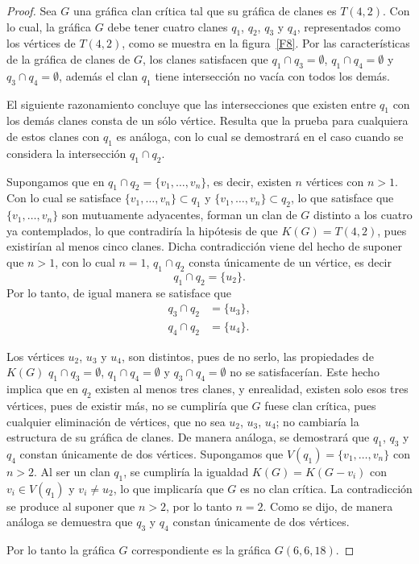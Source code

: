 \documentclass[12pt]{book}
\theoremstyle{definition}
\begin{document}
\begin{proof}
Sea $G$ una gráfica clan crítica tal que su gráfica de clanes es $T(4,2)$. Con lo cual, la gráfica $G$ debe tener cuatro clanes $q_1$, $q_2$, $q_3$ y $q_4$, representados como los vértices de $T(4,2)$, como se muestra en la figura~\ref{F8}. Por las características de la gráfica de clanes de $G$, los clanes satisfacen que $q_1\cap q_3=\emptyset$, $q_1\cap q_4=\emptyset$ y $q_3\cap q_4=\emptyset$, además el clan $q_1$ tiene intersección no vacía con todos los demás.

El siguiente razonamiento concluye que las intersecciones que existen entre $q_1$ con los demás clanes consta de un sólo vértice. Resulta que la prueba para cualquiera de estos clanes con $q_1$ es análoga, con lo cual se demostrará en el caso cuando se considera la intersección $q_1\cap q_2$.

Supongamos que en $q_1\cap q_2=\{v_1, \dots ,v_n\}$, es decir, existen $n$ vértices con $n>1$. Con lo cual se satisface $\{v_1, \dots ,v_n\}\subset q_1$ y $\{v_1, \dots ,v_n\}\subset q_2$, lo que satisface que $\{v_1, \dots ,v_n\}$ son mutuamente adyacentes, forman un clan de $G$ distinto a los cuatro ya contemplados, lo que contradiría la hipótesis de que $K(G)=T(4,2)$, pues existirían al menos cinco clanes. Dicha contradicción viene del hecho de suponer que $n>1$, con lo cual $n=1$, $q_1\cap q_2$ consta únicamente de un vértice, es decir
\begin{equation*}
q_1\cap q_2= \{u_2\}.
\end{equation*}
Por lo tanto, de igual manera se satisface que 
\begin{equation*}
\begin{aligned}
q_3\cap q_2 &= \{u_3\}, \\
q_4\cap q_2 &= \{u_4\}.
\end{aligned}
\end{equation*}

Los vértices $u_2$, $u_3$ y $u_4$, son distintos, pues de no serlo, las propiedades de $K(G)$ $q_1\cap q_3=\emptyset$, $q_1\cap q_4=\emptyset$ y $q_3\cap q_4=\emptyset$ no se satisfacerían. Este hecho implica que en $q_2$ existen al menos tres clanes, y enrealidad, existen solo esos tres vértices, pues de existir más, no se cumpliría que $G$ fuese clan crítica, pues cualquier eliminación de vértices, que no sea $u_2$, $u_3$, $u_4$; no cambiaría la estructura de su gráfica de clanes.
De manera análoga, se demostrará que $q_1$, $q_3$ y $q_4$ constan únicamente de dos vértices. Supongamos que $V(q_1)=\{v_1, \dots ,v_n\}$ con $n>2$. Al ser un clan $q_1$, se cumpliría la igualdad $K(G)=K(G-v_i)$ con $v_i\in V(q_1)$ y $v_i\neq u_2$, lo que implicaría que $G$ es no clan crítica. La contradicción se produce al suponer que $n>2$, por lo tanto $n=2$. Como se dijo, de manera análoga se demuestra que $q_3$ y $q_4$ constan únicamente de dos vértices.

Por lo tanto la gráfica $G$ correspondiente es la gráfica $G(6,6,18)$.
\end{proof}
\end{document}
